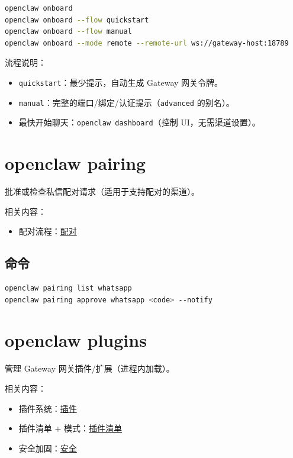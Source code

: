 \begin{lstlisting}[language=bash]
openclaw onboard
openclaw onboard --flow quickstart
openclaw onboard --flow manual
openclaw onboard --mode remote --remote-url ws://gateway-host:18789
\end{lstlisting}


流程说明：

\begin{itemize}
  \item \texttt{quickstart}：最少提示，自动生成 Gateway 网关令牌。
  \item \texttt{manual}：完整的端口/绑定/认证提示（\texttt{advanced} 的别名）。
  \item 最快开始聊天：\texttt{openclaw dashboard}（控制 UI，无需渠道设置）。
\end{itemize}



\clearpage

\section{openclaw pairing}


批准或检查私信配对请求（适用于支持配对的渠道）。

相关内容：

\begin{itemize}
  \item 配对流程：\href{/channels/pairing}{配对}
\end{itemize}


\subsection{命令}


\begin{lstlisting}[language=bash]
openclaw pairing list whatsapp
openclaw pairing approve whatsapp <code> --notify
\end{lstlisting}



\clearpage

\section{openclaw plugins}


管理 Gateway 网关插件/扩展（进程内加载）。

相关内容：

\begin{itemize}
  \item 插件系统：\href{/tools/plugin}{插件}
  \item 插件清单 + 模式：\href{/plugins/manifest}{插件清单}
  \item 安全加固：\href{/gateway/security}{安全}
\end{itemize}


